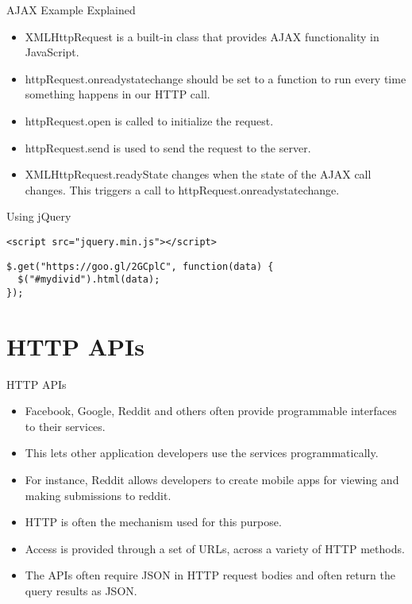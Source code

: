 \begin{frame}{AJAX Example Explained}
  \begin{itemize}
    \item XMLHttpRequest is a built-in class that provides AJAX functionality in JavaScript.
    \item httpRequest.onreadystatechange should be set to a function to run every time something happens in our HTTP call.
    \item httpRequest.open is called to initialize the request.
    \item httpRequest.send is used to send the request to the server.
    \item XMLHttpRequest.readyState changes when the state of the AJAX call changes. This triggers a call to httpRequest.onreadystatechange.
  \end{itemize}
\end{frame}

\begin{frame}[fragile]{Using jQuery}
  \begin{verbatim}
<script src="jquery.min.js"></script>
  \end{verbatim}
  \vspace{1cm}
  \begin{verbatim}
$.get("https://goo.gl/2GCplC", function(data) {
  $("#mydivid").html(data);
});
  \end{verbatim}
\end{frame}


\section{HTTP APIs}


\begin{frame}{HTTP APIs}
	\begin{itemize}
		\item Facebook, Google, Reddit and others often provide programmable interfaces to their services.
		\item This lets other application developers use the services programmatically.
		\item For instance, Reddit allows developers to create mobile apps for viewing and making submissions to reddit.
		\item HTTP is often the mechanism used for this purpose.
		\item Access is provided through a set of URLs, across a variety of HTTP methods.
		\item The APIs often require JSON in HTTP request bodies and often return the query results as JSON.
	\end{itemize}
\end{frame}



